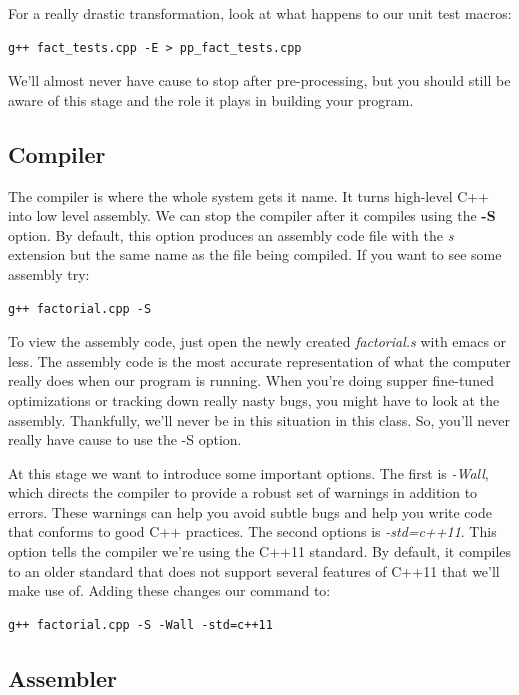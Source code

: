 \documentclass[]{tufte-handout}
\begin{document}
For a really drastic transformation, look at what happens to our unit test macros:
\begin{verbatim}
g++ fact_tests.cpp -E > pp_fact_tests.cpp
\end{verbatim}

We'll almost never have cause to stop after pre-processing, but you should still be aware of this stage and the role it plays in building your program. 

\subsection{Compiler}

The compiler is where the whole system gets it name.  It turns high-level C++ into low level assembly.  We can stop the compiler after it compiles using the \textbf{-S} option. By default, this option produces an assembly code file with the \textit{s} extension but the same name as the file being compiled. If you want to see some assembly try:
\begin{verbatim}
g++ factorial.cpp -S
\end{verbatim}
To view the assembly code, just open the newly created \textit{factorial.s} with emacs or less. The assembly code is the most accurate representation of what the computer really does when our program is running.  When you're doing supper fine-tuned optimizations or tracking down really nasty bugs, you might have to look at the assembly.  Thankfully, we'll never be in this situation in this class. So, you'll never really have cause to use the -S option.  

At this stage we want to introduce some important options. The first is \textit{-Wall}, which directs the compiler to provide a robust set of warnings in addition to errors. These warnings can help you avoid subtle bugs and help you write code that conforms to good C++ practices. The second options is \textit{-std=c++11}. This option tells the compiler we're using the C++11 standard. By default, it compiles to an older standard that does not support several features of C++11 that we'll make use of.  Adding these changes our command to:
\begin{verbatim}
g++ factorial.cpp -S -Wall -std=c++11
\end{verbatim}

\subsection{Assembler}
\end{document}
